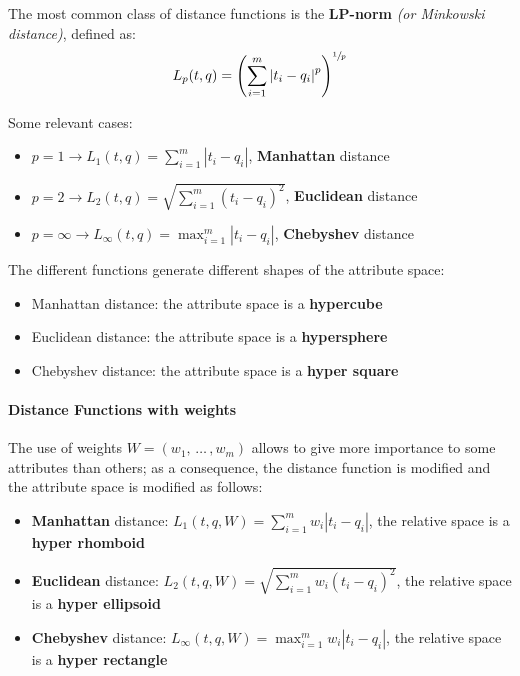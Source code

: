 \documentclass[english]{article}
\begin{document}
The most common class of distance functions is the \textbf{LP-norm} \textit{(or Minkowski distance)}, defined as:
\[ L_p(t, q) = \left( \displaystyle\sum_{i=1}^m \left| t_i - q_i \right|^p  \right)^{\sfrac{1}{p}} \]

Some relevant cases:

\begin{itemize}[itemsep=1ex]
  \item \(p = 1 \rightarrow L_1(t, q) = \displaystyle\sum_{i=1}^m \left| t_i - q_i \right|\), \textbf{Manhattan} distance
  \item \(p = 2 \rightarrow L_2(t, q) = \sqrt{\displaystyle\sum_{i=1}^m \left( t_i - q_i \right)^2}\), \textbf{Euclidean} distance
  \item \(p = \infty \rightarrow L_\infty(t, q) =\displaystyle \max_{i=1}^m \left| t_i - q_i \right|\), \textbf{Chebyshev} distance
\end{itemize}

The different functions generate different shapes of the attribute space:

\begin{itemize}
  \item Manhattan distance: the attribute space is a \textbf{hypercube}
  \item Euclidean distance: the attribute space is a \textbf{hypersphere}
  \item Chebyshev distance: the attribute space is a \textbf{hyper square}
\end{itemize}

\paragraph*{Distance Functions with weights}

The use of weights \(W = \left( w_1, \,\ldots\,, w_m \right)\) allows to give more importance to some attributes than others;
as a consequence, the distance function is modified and the attribute space is modified as follows:

\begin{itemize}[itemsep=1.5ex]
  \item \textbf{Manhattan} distance: \(L_1(t, q, W) = \displaystyle\sum_{i=1}^m w_i \left| t_i - q_i \right|\), the relative space is a \textbf{hyper rhomboid}
  \item \textbf{Euclidean} distance: \(L_2(t, q, W) = \sqrt{\displaystyle\sum_{i=1}^m w_i \left( t_i - q_i \right)^2}\), the relative space is a \textbf{hyper ellipsoid}
  \item \textbf{Chebyshev} distance: \(L_\infty(t, q, W) = \max_{i=1}^m w_i \left| t_i - q_i \right|\), the relative space is a \textbf{hyper rectangle}
\end{itemize}
\end{document}
